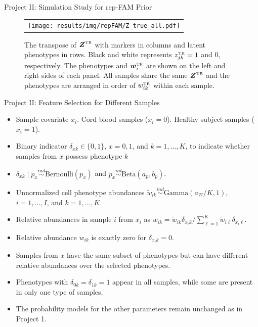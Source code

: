 \documentclass[ignorenonframetext,]{beamer}
\newcommand{\iid}{\overset{iid}{\sim}}
\newcommand{\true}{{\mbox{\tiny TR}}}
\newcommand{\bZ}{\mbox{\boldmath $Z$}}
\newcommand{\bw}{\mbox{\boldmath $w$}}
\newcommand{\ind}{\overset{ind}{\sim}}
\begin{document}
\begin{frame}{Project II: Simulation Study for rep-FAM Prior}
\begin{figure}
  \begin{center}
\begin{tabular}{c}
\texttt{[image: results/img/repFAM/Z\_true\_all.pdf]}
  \end{tabular}
 \end{center}
 \vspace{-0.05in}
\caption{The transpose of $\bZ^\true$ with markers in columns and latent
phenotypes in rows. Black and white represents $z^\true_{jk}=1$ and 0,
respectively. The phenotypes and $\bw^\true_i$ are shown on the left and
right sides of each panel.  All samples share the same $\bZ^\true$ and the phenotypes are arranged in order of
$w_{ik}^\true$ within each sample.}
\label{fig:repFAM-sim-Z}
\end{figure}
\end{frame}

\begin{frame}{Project II: Feature Selection for Different Samples}
  \begin{itemize}
    \item Sample covariate $x_i$. Cord blood samples ($x_i=0$). Healthy subject samples ($x_i=1$).
      \pause
    \item Binary indicator $\delta_{xk}\in \{0, 1\}$, $x=0,1$, and $k=1,\ldots,
      K$, to indicate whether samples from $x$ possess phenotype $k$ 
      \pause
    \item $\delta_{xk} \mid p_x \ind \text{Bernoulli}(p_{x})$ and $p_x \iid
      \text{Beta}(a_p, b_p)$.
      \pause
    \item Unnormalized cell phenotype abundances $\tilde w_{ik} \ind
      \text{Gamma}(a_W/K, 1)$, $i=1, \ldots, I$, and $k=1, \ldots, K$. 
      \pause
    \item Relative abundances in sample $i$ from $x_i$ as $ w_{ik} =\tilde
      w_{ik} \delta_{x_i k}/\sum_{\ell=1}^K\tilde w_{i\ell} \delta_{x_i \ell}$.
    \item Relative abundance $w_{ik}$ is exactly zero for $\delta_{x_ik}=0$. 
      \pause
    \item Samples from $x$ have the same subset of phenotypes but can have
      different relative abundances over the selected phenotypes. 
      \pause
    \item Phenotypes with $\delta_{0k}=\delta_{1k}=1$ appear in all samples,
      while some are present in only one type of samples. 
      \pause
    \item The probability models for the other parameters remain unchanged as
      in Project 1.  
  \end{itemize}
\end{frame}
\end{document}
